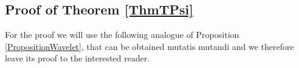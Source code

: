 \documentclass[11pt, a4paper,leqno]{amsart}
\newtheorem{theorem}{Theorem}
\theoremstyle{plain}
\newtheorem{corollary}{Corollary}
\numberwithin{equation}{section}
\theoremstyle{definition}
\theoremstyle{remark}
\begin{document}
%
%
%
%

\subsection{Proof of Theorem \ref{ThmTPsi}}
For the proof we will use the following analogue of Proposition
\ref{PropositionWavelet}, that can be obtained mutatis mutandi and we
therefore leave its proof to the interested reader.
\end{document}
